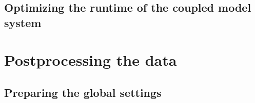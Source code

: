 \documentclass[a4paper,titlepage]{scrartcl}
\begin{document}
\subsection{Optimizing the runtime of the coupled model system}
\label{sec:optimizing}

\newpage
\section{Postprocessing the data}


\subsection{Preparing the global settings}
\end{document}
